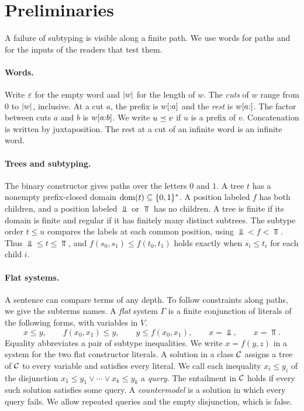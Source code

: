 \section{Preliminaries}
\label{sec:prelim}

A failure of subtyping is visible along a finite path. We use words for paths
and for the inputs of the readers that test them.

\paragraph*{Words.}
Write $\varepsilon$ for the empty word and $\lvert w\rvert$ for the length of $w$. The
\emph{cuts} of $w$ range from $0$ to $\lvert w\rvert$, inclusive. At a cut $a$,
the prefix is $w[{:}a]$ and the \emph{rest} is $w[a{:}]$.
The factor between cuts $a$ and $b$ is $w[a{:}b]$.
We write $u\preceq v$ if $u$ is a prefix of $v$. Concatenation is written
by juxtaposition. The rest at a cut of an infinite word is an infinite word.

\paragraph*{Trees and subtyping.}
The binary constructor gives paths over the letters $0$ and $1$.
A tree $t$ has a nonempty prefix-closed domain $\operatorname{dom}(t)\subseteq\{0,1\}^*$.
A position labeled $f$ has both children, and a position labeled $\Bot$
or $\Top$ has no children. A tree is finite if its domain is finite and
regular if it has finitely many distinct subtrees.
The subtype order $t\le u$ compares the labels at each common position, using
$\Bot<f<\Top$. Thus $\Bot\le t\le\Top$, and $f(s_0,s_1)\le f(t_0,t_1)$
holds exactly when $s_i\le t_i$ for each child $i$.

\paragraph*{Flat systems.}
A sentence can compare terms of any depth. To follow constraints along paths,
we give the subterms names. A \emph{flat} system $\Gamma$ is a finite
conjunction of literals of the following forms, with variables in $V$.
\[
  x\le y,\qquad f(x_0,x_1)\le y,\qquad y\le f(x_0,x_1),
  \qquad x=\Bot,\qquad x=\Top .
\]
Equality abbreviates a pair of subtype inequalities. We write $x=f(y,z)$
in a system for the two flat constructor literals. A solution in a class
$\mathcal C$ assigns a tree of $\mathcal C$ to every variable and satisfies every
literal. We call each inequality $x_i\le y_i$ of the disjunction
$x_1\le y_1\lor\cdots\lor x_k\le y_k$ a \emph{query}. The entailment in
$\mathcal C$ holds if every such solution satisfies some query. A
\emph{countermodel} is a solution in which every query fails. We allow
repeated queries and the empty disjunction, which is false.

